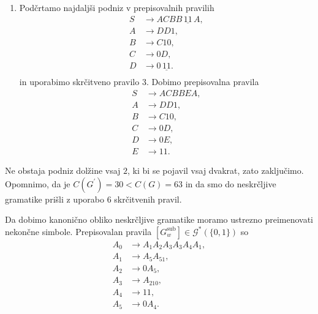 \documentclass[fin1, tisk]{fmfdelo}
\newcommand{\G}{\mathcal{G}}
\theoremstyle{definition}
\begin{document}
\begin{primer}
\begin{enumerate}
        \item Podčrtamo najdaljši podniz v prepisovalnih pravilih
        \begin{align*}
            S &\rightarrow ACBB \, \underline{11} \, A, \\
            A &\rightarrow DD1, \\
            B &\rightarrow C10, \\
            C &\rightarrow 0D, \\
            D &\rightarrow 0 \, \underline{11}. \\
        \end{align*}
        in uporabimo skrčitveno pravilo $3$. Dobimo prepisovalna pravila
        \begin{align*}
            S &\rightarrow ACBBEA, \\
            A &\rightarrow DD1, \\
            B &\rightarrow C10, \\
            C &\rightarrow 0D, \\
            D &\rightarrow 0E, \\
            E &\rightarrow 11.
        \end{align*}
    \end{enumerate}
    Ne obstaja podniz dolžine vsaj $2$, ki bi se pojavil vsaj dvakrat, zato zaključimo.
    Opomnimo, da je $C(G^\prime) = 30 < C(G) = 63$ in da smo do neskrčljive gramatike prišli
    z uporabo $6$ skrčitvenih pravil.

    Da dobimo kanonično obliko neskrčljive gramatike moramo ustrezno preimenovati
    nekončne simbole. Prepisovalan pravila $[G^\text{sub}_w] \in \G^*(\{ 0, 1 \})$ so
    \begin{align*}
        A_0 &\rightarrow A_1A_2A_3A_3A_4A_1, \\
        A_1 &\rightarrow A_5A_51, \\
        A_2 &\rightarrow 0A_5, \\
        A_3 &\rightarrow A_210, \\
        A_4 &\rightarrow 11, \\
        A_5 &\rightarrow 0A_4.
    \end{align*}
\end{primer}
\end{document}
